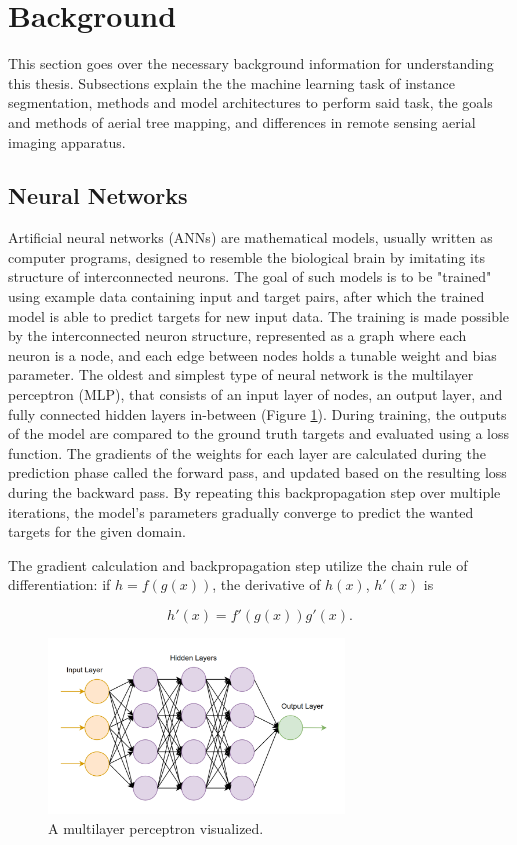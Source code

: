 \documentclass[english, 12pt, a4paper, sci, utf8, a-2b, online]{aaltothesis}
\begin{document}
\newpage
\section{Background}

This section goes over the necessary background information for understanding this thesis. Subsections explain the the machine learning task of instance segmentation, methods and model architectures to perform said task, the goals and methods of aerial tree mapping, and differences in remote sensing aerial imaging apparatus.

\subsection{Neural Networks}

Artificial neural networks (ANNs) are mathematical models, usually written as computer programs, designed to resemble the biological brain by imitating its structure of interconnected neurons. The goal of such models is to be "trained" using example data containing input and target pairs, after which the trained model is able to predict targets for new input data. The training is made possible by the interconnected neuron structure, represented as a graph where each neuron is a node, and each edge between nodes holds a tunable weight and bias parameter. The oldest and simplest type of neural network is the multilayer perceptron (MLP), that consists of an input layer of nodes, an output layer, and fully connected hidden layers in-between (Figure \ref{fig:mlp}). During training, the outputs of the model are compared to the ground truth targets and evaluated using a loss function. The gradients of the weights for each layer are calculated during the prediction phase called the forward pass, and updated based on the resulting loss during the backward pass. By repeating this backpropagation step over multiple iterations, the model's parameters gradually converge to predict the wanted targets for the given domain.
\cite{ann}

The gradient calculation and backpropagation step utilize the chain rule of differentiation: if $h = f(g(x))$, the derivative of $h(x)$, $h'(x)$ is

\begin{equation}
    h'(x) = f'(g(x))g'(x).
\end{equation}

\begin{figure}[h]
    \centering
    \includegraphics[width=0.7\textwidth]{figures/mlp.png}
    \caption{A multilayer perceptron visualized. \cite{julius}}
    \label{fig:mlp}
\end{figure}
\end{document}
